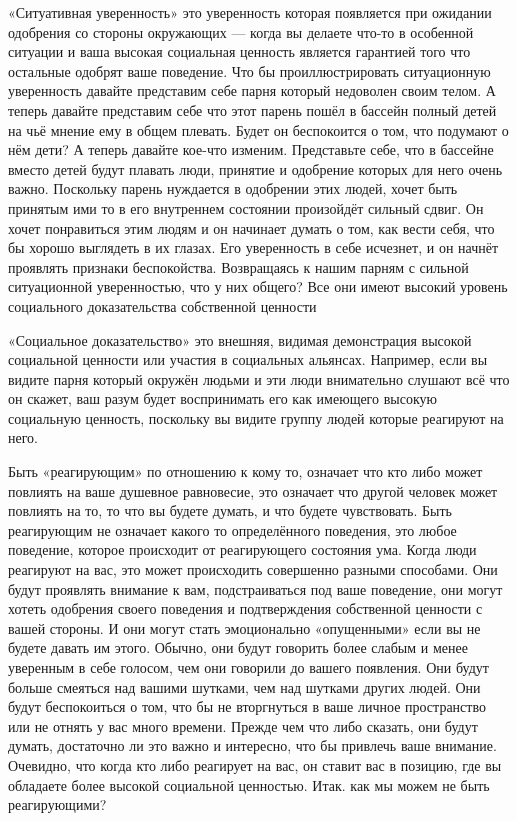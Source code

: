 «Ситуативная уверенность» это уверенность которая появляется при ожидании одобрения со стороны окружающих --- когда вы делаете что-то в особенной ситуации и ваша высокая социальная ценность является гарантией того что остальные одобрят ваше поведение. Что бы проиллюстрировать ситуационную уверенность давайте представим себе парня который недоволен своим телом. А теперь давайте представим себе что этот парень пошёл в бассейн полный детей на чьё мнение ему в общем плевать. Будет он беспокоится о том, что подумают о нём дети? А теперь давайте кое-что изменим. Представьте себе, что в бассейне вместо детей будут плавать люди, принятие и одобрение которых для него очень важно. Поскольку парень нуждается в одобрении этих людей, хочет быть принятым ими то в его внутреннем состоянии произойдёт сильный сдвиг. Он хочет понравиться этим людям и он начинает думать о том, как вести себя, что бы хорошо выглядеть в их глазах. Его уверенность в себе исчезнет, и он начнёт проявлять признаки беспокойства. Возвращаясь к нашим парням с сильной ситуационной уверенностью, что у них общего? Все они имеют высокий уровень социального доказательства собственной ценности

«Социальное доказательство» это внешняя, видимая демонстрация высокой социальной ценности или участия в социальных альянсах. Например, если вы видите парня который окружён людьми и эти люди внимательно слушают всё что он скажет, ваш разум будет воспринимать его как имеющего высокую социальную ценность, поскольку вы видите группу людей которые реагируют на него.

Быть «реагирующим» по отношению к кому то, означает что кто либо может повлиять на ваше душевное равновесие, это означает что другой человек может повлиять на то, то что вы будете думать, и что будете чувствовать. Быть реагирующим не означает какого то определённого поведения, это любое поведение, которое происходит от реагирующего состояния ума. Когда люди реагируют на вас, это может происходить совершенно разными способами. Они будут проявлять внимание к вам, подстраиваться под ваше поведение, они могут хотеть одобрения своего поведения и подтверждения собственной ценности с вашей стороны. И они могут стать эмоционально «опущенными» если вы не будете давать им этого. Обычно, они будут говорить более слабым и менее уверенным в себе голосом, чем они говорили до вашего появления. Они будут больше смеяться над вашими шутками, чем над шутками других людей. Они будут беспокоиться о том, что бы не вторгнуться в ваше личное пространство или не отнять у вас много времени. Прежде чем что либо сказать, они будут думать, достаточно ли это важно и интересно, что бы привлечь ваше внимание. Очевидно, что когда кто либо реагирует на вас, он ставит вас в позицию, где вы обладаете более высокой социальной ценностью. Итак. как мы можем не быть реагирующими?

